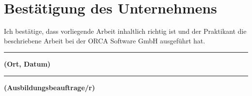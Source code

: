 
\chapter{Bestätigung des Unternehmens}
Ich bestätige, dass vorliegende Arbeit inhaltlich richtig ist und der Praktikant die beschriebene Arbeit bei der ORCA Software GmbH ausgeführt hat.
\\
\newcommand\signature[1]{%
	\noindent\begin{minipage}{6cm}
		\noindent\vspace{3cm}\par
		\noindent\rule{6cm}{1pt}\par
		\noindent\textbf{#1}\par
\end{minipage}}
\newcommand\insertdate[1][\today]{\vfill\begin{flushright}#1\end{flushright}}

\signature{(Ort, Datum)}\hfill\signature{(Ausbildungsbeauftrage/r)}


